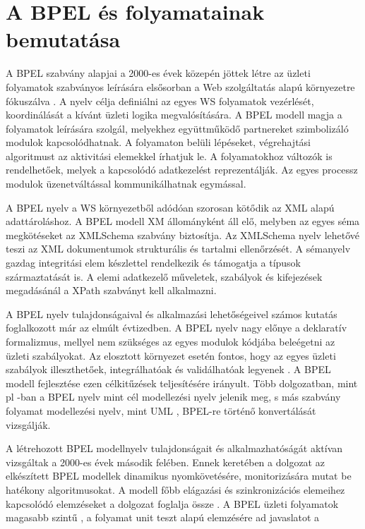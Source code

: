 
\chapter{A BPEL és folyamatainak bemutatása} 
A BPEL szabvány alapjai a 2000-es évek közepén jöttek létre az üzleti folyamatok szabványos leírására elsősorban a Web szolgáltatás alapú környezetre fókuszálva \cite{andrews2003business}. A nyelv célja definiálni az  egyes WS folyamatok vezérlését, koordinálását a kívánt üzleti logika megvalósítására.  A BPEL modell magja  a folyamatok leírására szolgál, melyekhez együttműködő partnereket szimbolizáló modulok kapcsolódhatnak. A folyamaton belüli lépéseket, végrehajtási algoritmust az aktivitási elemekkel írhatjuk le. A folyamatokhoz változók is rendelhetőek, melyek a kapcsolódó adatkezelést reprezentálják. Az egyes processz modulok üzenetváltással kommunikálhatnak egymással.   

A BPEL nyelv a WS környezetből adódóan szorosan kötődik az XML alapú adattároláshoz. A BPEL modell XM állományként áll elő, melyben az egyes séma megkötéseket az XMLSchema szabvány biztosítja. Az XMLSchema nyelv lehetővé teszi az XML dokumentumok strukturális és tartalmi ellenőrzését. A sémanyelv  gazdag integritási elem készlettel rendelkezik és támogatja a típusok származtatását is. A elemi adatkezelő műveletek, szabályok és kifejezések megadásánál a XPath szabványt kell alkalmazni.  

A BPEL nyelv tulajdonságaival és alkalmazási lehetőségeivel számos kutatás foglalkozott már az elmúlt évtizedben. A BPEL nyelv nagy előnye a deklaratív formalizmus, mellyel nem szükséges  az egyes modulok kódjába beleégetni az üzleti szabályokat. Az elosztott környezet esetén fontos, hogy az egyes üzleti szabályok illeszthetőek, integrálhatóak és validálhatóak legyenek \cite{rosenberg2005business}.  A BPEL modell fejlesztése ezen célkitűzések teljesítésére irányult.   Több dolgozatban, mint pl \cite{ouyang2006translating}-ban a BPEL nyelv mint cél modellezési nyelv jelenik meg, s más szabvány folyamat modellezési nyelv, mint UML , BPEL-re történő konvertálását vizsgálják.   

A létrehozott BPEL modellnyelv tulajdonságait és alkalmazhatóságát  aktívan vizsgáltak a 2000-es évek második felében. Ennek keretében a \cite{baresi2005towards} dolgozat az elkészített BPEL modellek dinamikus nyomkövetésére, monitorizására  mutat be hatékony algoritmusokat.  A modell főbb elágazási és szinkronizációs elemeihez kapcsolódó elemzéseket a \cite{ouyang2005wofbpel} dolgozat foglalja össze . A BPEL üzleti folyamatok magasabb szintű , a folyamat unit teszt alapú elemzésére ad javaslatot a \cite{mayer2006towards}

